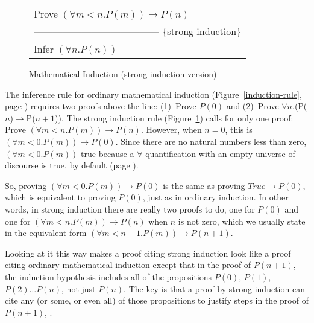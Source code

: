 \begin{figure}
\begin{center}
\begin{tabular}{l}
Prove $(\forall m<n.P(m))\rightarrow P(n)$ \\
----------------------------------------\{strong induction\}\\
Infer $(\forall n.P(n))$
\end{tabular}
\end{center}
\caption{Mathematical Induction (strong induction version)}
\label{strong-induction-rule}
\end{figure}

\begin{aside}
The inference rule for ordinary mathematical induction
(Figure~\ref{induction-rule}, page \pageref{induction-rule})
requires two proofs above the line:
(1)~Prove $P(0)$ and (2)~Prove $\forall$$n$.(P($n$)$\rightarrow$P($n+1$)).
The strong induction rule
(Figure~\ref{strong-induction-rule})
calls for only one proof:
Prove $(\forall m<n.P(m))\rightarrow P(n)$.
However, when $n = 0$, this is
$(\forall m<0.P(m))\rightarrow P(0)$.
Since there
are no natural numbers less than zero,
$(\forall m<0.P(m))$ true because
a $\forall$ quantification with an empty universe of discourse
is true, by default
(page \pageref{empty-forall}).

So, proving $(\forall m<0.P(m))\rightarrow P(0)$
is the same as proving $True \rightarrow P(0)$,
which is equivalent to proving $P(0)$,
just as in ordinary induction.
In other words, in strong induction there are really two proofs to do,
one for $P(0)$ and one for $(\forall m<n.P(m))\rightarrow P(n)$
when $n$ is not zero, which we usually state in the
equivalent form $(\forall m<n+1.P(m))\rightarrow P(n+1)$.

Looking at it this way makes a proof citing strong induction look like
a proof citing ordinary mathematical induction except that
in the proof of $P(n+1)$, the
induction hypothesis
includes all of the propositions $P(0)$, $P(1)$, $P(2) \dots P(n)$, not just $P(n)$.
The key is that a proof by strong induction
can cite any (or some, or even all) of those propositions
to justify steps in the proof of $P(n+1)$, .
\caption{Strong Induction Requires Two Proofs or One?}
\label{strong-induction-rule-2-hyps-or-1}
\end{aside}

